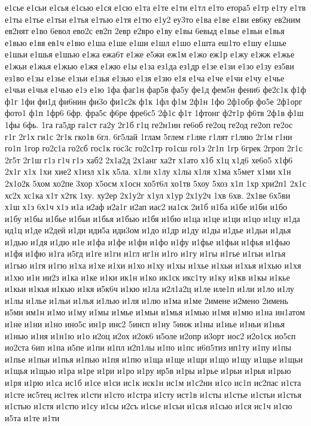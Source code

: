 {е1сье
е1сьи
е1сья
е1сью
е1ся
е1сю
е1та
е1те
е1ти
е1тл
е1то
етора5
е1тр
е1ту
е1тв
е1ты
е1тье
е1тьи
е1тья
е1тью
е1тя
е1тю
е1у2
еу3то
е1ва
е1ве
е1ви
ев6ку
ев2ним
ев2нят
е1во
6евол
ево2с
ев2п
2евр
е2вро
е1ву
е1вы
6евыд
е1вье
е1вьи
е1вья
е1вью
е1вя
ев1ч
е1вю
е1ша
е1ше
е1ши
е1шл
е1шо
е1шта
еш1то
е1шу
е1шье
е1шьи
е1шья
е1шью
е1жа
ежа6т
е1же
е5жи
еж1м
е1жо
еж1р
е1жу
е1жж
е1жье
е1жьи
е1жья
е1жью
е1жя
е1жю
е1ы
е1за
ез1да
ез1др
е1зе
е1зи
е1зо
е1зу
ез5ви
ез1во
е1зы
е1зье
е1зьи
е1зья
е1зью
е1зя
е1зю
е1я
е1ча
е1че
е1чи
е1чу
е1чье
е1чьи
е1чья
е1чью
е1э
е1ю
1фа
фаг1н
фар5в
фа5у
фе1д
фем5н
фени6
фе2с1к
ф1ф
ф1г
1фи
фи1д
фи6нин
фи3о
фи1с2к
ф1к
1фл
ф1м
2ф1н
1фо
2ф1обр
фо5е
2ф1орг
фото1
ф1п
1фр6
6фр.
фра5с
ф6ре
фре6с5
2ф1с
ф1т
1фтонг
ф2т1р
ф6тв
2ф1в
ф1ш
1фы
6фь.
1га
га5др
га1ст
га2у
2г1б
г1ц
ге2н1ин
ге6об
ге2оц
ге2од
ге2оп
ге2ос
г1г
2г1х
ги1с
2г1к
гко1в
6гл.
6г5лай
1глам
5глем
г1ляе
г1лят
г1ляю
2г1м
г1ни
го1п
1гор
го2с1а
го2сб
гос1к
гос3с
го2с1тр
го1сш
го1з
2г1п
1гр
6грек
2гроп
2г1с
2г5т
2г1ш
г1з
г1ч
г1э
хаб2
2х1а2д
2х1анг
ха2т
х1ато
х1б
х1ц
х1д6
хе6о5
х1ф6
2х1г
х1х
1хи
хие2
х1изл
х1к
х5ла.
х1ли
х1лу
х1лы
х1ля
х1ма
х5мет
х1ми
х1н
2х1о2к
5хом
хо2пе
3хор
х5осм
х1осн
хо5т6л
хо1тв
5хоу
5хоз
х1п
1хр
хри2п1
2х1с
хс2х
хс1ка
х1т
х2тк
1ху.
ху2ер
2х1у2г
х1ул
х1ур
2х1у2ч
1хв
6хв.
2х1ве
6х5ви
х1ш
х1з
6х1ч
х1э
и1а
и2аф
и2а1г
и2ап
иас2
иа1ск
2и1б
и1ба
и1бе
и1би
и1бо
и1бу
и1бы
и1бье
и1бьи
и1бья
и1бью
и1бя
и1бю
и1ца
и1це
и1ци
и1цо
и1цу
и1да
ид1ц
и1де
и2дей
и1ди
иди5а
иди3ом
и1до
и1др
и1ду
и1ды
и1дье
и1дьи
и1дья
и1дью
и1дя
и1дю
и1е
и1фа
и1фе
и1фи
и1фо
и1фу
и1фье
и1фьи
и1фья
и1фью
и1фя
и1фю
и1га
и5гд
и1ге
и1ги
и1гл
иг1н
и1го
и1гу
и1гы
и1гье
и1гьи
и1гья
и1гью
и1гя
и1гю
и1ха
и1хе
и1хи
и1хо
и1ху
и1хы
и1хье
и1хьи
и1хья
и1хью
и1хя
и1хю
и1и
ии2з
и1ка
и1ке
и1ки
ик1н
и1ко
ик1ск
икс1ту
и1ку
и1кв
и1кы
и1кье
и1кьи
и1кья
и1кью
и1кя
и5к6ч
и1кю
и1ла
и2л1а2ц
и1ле
иле1п
и1ли
и1ло
и1лу
и1лы
и1лье
и1льи
и1лья
и1лью
и1ля
и1лю
и1ма
и1ме
2имене
и2мено
2имень
и5ми
им1н
и1мо
и1му
и1мы
и1мье
и1мьи
и1мья
и1мью
и1мя
и1мю
и1на
ин1атом
и1не
и1ни
и1но
ино5с
ин1р
инс2
5инсп
и1ну
5инж
и1ны
и1нье
и1ньи
и1нья
и1нью
и1ня
и1н1ю
и1о
и2оц
и2ох
и2ок6
и5оле
и2опр
и3орт
иос2
и2о1ск
ио5сп
ио2ста
6ип
и1па
и5пе
и1пи
и1пл
и2п1лы
и1по
и1пс
и6п5тиз
ип1ту
и1пу
и1пы
и1пье
и1пьи
и1пья
и1пью
и1пя
и1пю
и1ща
и1ще
и1щи
и1що
и1щу
и1щье
и1щьи
и1щья
и1щью
и1ра
и1ре
и1ри
и1ро
и1ру
ир5в
и1ры
и1рье
и1рьи
и1рья
и1рью
и1ря
и1рю
и1са
ис1б
и1се
и1си
ис1к
иск1н
ис1м
и1с2ни
и1со
ис1п
ис2пас
и1ста
и1сте
ис5тец
ис1тек
и1сти
и1сто
и1стра
и1сту
ист1в
и1сты
и1стье
и1стьи
и1стья
и1стью
и1стя
и1стю
и1су
и1сы
и2съ
и1сье
и1сьи
и1сья
и1сью
и1ся
ис1ч
и1сю
и5та
и1те
и1ти
}
